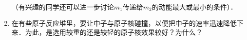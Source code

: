 \begin{enumerate}
（有兴趣的同学还可以进一步讨论$m_1$传递给$m_2$的动能最大或最小的条件）．

\item 在有些原子反应堆里，要让中子与原子核碰撞，以便把中子的速率迅速降低下来．为此，是选用较重的还是较轻的原子核效果较好？为什么？
\end{enumerate}

